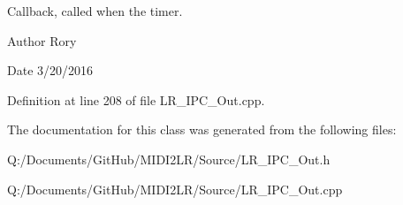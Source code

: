 Callback, called when the timer. 

\begin{DoxyAuthor}{Author}
Rory 
\end{DoxyAuthor}
\begin{DoxyDate}{Date}
3/20/2016 
\end{DoxyDate}


Definition at line 208 of file L\+R\+\_\+\+I\+P\+C\+\_\+\+Out.\+cpp.



The documentation for this class was generated from the following files\+:\begin{DoxyCompactItemize}
\item 
Q\+:/\+Documents/\+Git\+Hub/\+M\+I\+D\+I2\+L\+R/\+Source/L\+R\+\_\+\+I\+P\+C\+\_\+\+Out.\+h\item 
Q\+:/\+Documents/\+Git\+Hub/\+M\+I\+D\+I2\+L\+R/\+Source/L\+R\+\_\+\+I\+P\+C\+\_\+\+Out.\+cpp\end{DoxyCompactItemize}
